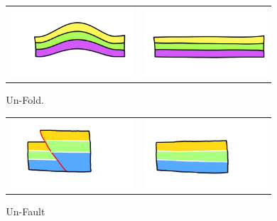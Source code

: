 \documentclass{beamer}
\begin{document}
\begin{frame}
\begin{columns}
\begin{column}{0.55\textwidth}
\begin{figure}[H]
\begin{tabular}{@{}ccc@{}}
	\end{tabular}
	\caption{Un-Erode}
	\label{unerodecveg}
	\end{figure}
	\end{column}
	\begin{column}{0.55\textwidth}
	\begin{figure}[H]
	\centering
	\begin{tabular}{@{}cc@{}}
	\includegraphics[width=.35\textwidth]{unFoldDescription0.png}&
	\includegraphics[width=.35\textwidth]{unFoldDescription1.png}\\
	\end{tabular}
	\caption{Un-Fold.}
	\label{unfoldeg}
	\end{figure}
	\begin{figure}[H]
	\centering
	\begin{tabular}{@{}cc@{}}
	\includegraphics[width=.35\textwidth]{unFaultDescription0.png}&
	\includegraphics[width=.35\textwidth]{unFaultDescription1.png}\\
	\end{tabular}
	\caption{Un-Fault}
	\label{unfaulteg}
	\end{figure}
	\end{column}
	\end{columns}
	\end{frame}			
	
\end{document}
